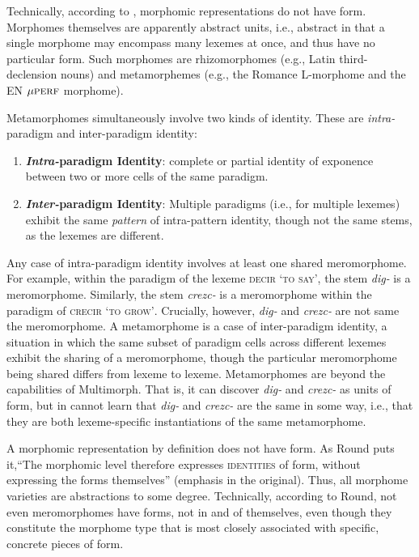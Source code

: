 	Technically, according to \cite{round:2011}, morphomic 
	representations do not have form. Morphomes
	themselves are apparently abstract units, i.e., abstract in that 
	a single morphome may encompass many lexemes at once, and thus
	have no particular form. Such morphomes are rhizomorphomes (e.g.,
	Latin third-declension nouns) and metamorphemes (e.g., the Romance L-morphome and the \ac{EN}
	${\mu}\textsc{perf}$ morphome).

	Metamorphomes simultaneously involve two kinds of identity. These are \emph{intra-}paradigm and {inter-}paradigm identity: 
	\begin{enumerate}
		\item \textbf{\emph{Intra-}paradigm Identity}: complete or partial identity of exponence between two or more cells of the same paradigm. 
		\item \textbf{\emph{Inter-}paradigm Identity}: Multiple paradigms (i.e., for multiple lexemes) exhibit the same \emph{pattern} of intra-pattern identity, though not the same stems, as the lexemes are different.
	\end{enumerate} 
Any case of intra-paradigm identity involves at least one shared 
meromorphome. For example, within the paradigm of the lexeme 
\textsc{decir} \textsc{`to say'}, 
the stem \textit{dig-} is a meromorphome. Similarly, the stem \textit{crezc-} 
is a meromorphome within the paradigm of 
\textsc{crecir} \textsc{`to grow'}. Crucially, however, 
\textit{dig-} and \textit{crezc-} are not same the meromorphome. 
A metamorphome is a case of inter-paradigm identity, a situation 
in which the same subset of paradigm cells across different lexemes 
exhibit the sharing of a meromorphome, 
though the particular meromorphome being shared differs from lexeme to 
lexeme. Metamorphomes are beyond the capabilities of Multimorph. 
That is, it can discover \textit{dig-} and \textit{crezc-} as units of form, 
but in cannot learn that \textit{dig-} and \textit{crezc-} are the same 
in some way, i.e., that they are both lexeme-specific instantiations of the
same metamorphome.

A morphomic representation by definition does not have form.
As Round puts it,``The morphomic level 
therefore expresses \textsc{identities} of form, without 
expressing the forms themselves'' \citep[][pp.220-221]{round:2011} (emphasis in the original).
Thus, all morphome varieties are abstractions to some degree. 
Technically, according to Round, not even 
meromorphomes have forms, not in and 
of themselves, even though they constitute the 
morphome type that is most closely associated with specific, concrete pieces of form. 

